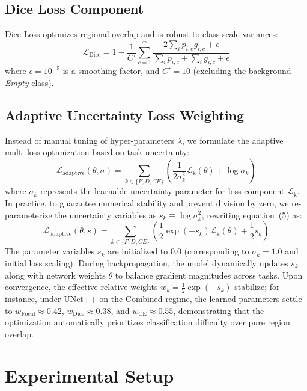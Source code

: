 \documentclass[journal,compsoc]{IEEEtran}
\newcommand{\loss}[1]{\mathcal{L}_{\text{#1}}}
\begin{document}
\subsection{Dice Loss Component}
Dice Loss optimizes regional overlap and is robust to class scale variances:
\begin{equation}
\loss{Dice} = 1 - \frac{1}{C'} \sum_{c=1}^{C'} \frac{2 \sum_i p_{i,c} g_{i,c} + \epsilon}{\sum_i p_{i,c} + \sum_i g_{i,c} + \epsilon}
\end{equation}
where $\epsilon = 10^{-5}$ is a smoothing factor, and $C' = 10$ (excluding the background \textit{Empty} class).

\subsection{Adaptive Uncertainty Loss Weighting}
Instead of manual tuning of hyper-parameters $\lambda$, we formulate the adaptive multi-loss optimization based on task uncertainty:
\begin{equation}
\loss{adaptive}(\theta, \sigma) = \sum_{k \in \{F, D, CE\}} \left( \frac{1}{2\sigma_k^2} \loss{k}(\theta) + \log \sigma_k \right)
\end{equation}
where $\sigma_k$ represents the learnable uncertainty parameter for loss component $\loss{k}$. In practice, to guarantee numerical stability and prevent division by zero, we re-parameterize the uncertainty variables as $s_k \equiv \log \sigma_k^2$, rewriting equation~(5) as:
\begin{equation}
\loss{adaptive}(\theta, s) = \sum_{k \in \{F, D, CE\}} \left( \frac{1}{2}\exp(-s_k) \loss{k}(\theta) + \frac{1}{2}s_k \right)
\end{equation}
The parameter variables $s_k$ are initialized to $0.0$ (corresponding to $\sigma_k = 1.0$ and initial loss scaling). During backpropagation, the model dynamically updates $s_k$ along with network weights $\theta$ to balance gradient magnitudes across tasks. Upon convergence, the effective relative weights $w_k = \frac{1}{2}\exp(-s_k)$ stabilize; for instance, under UNet++ on the Combined regime, the learned parameters settle to $w_{\text{Focal}} \approx 0.42$, $w_{\text{Dice}} \approx 0.38$, and $w_{\text{CE}} \approx 0.55$, demonstrating that the optimization automatically prioritizes classification difficulty over pure region overlap.


\section{Experimental Setup}
\label{sec:experimental_setup}
\end{document}
